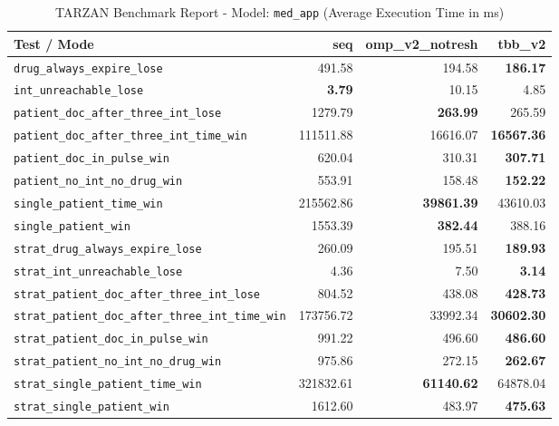 \begin{table}[htbp]
\centering
\caption{TARZAN Benchmark Report - Model: \texttt{med\_app} (Average Execution Time in ms)}
\label{tab:med_app_benchmark}
\begin{tabular}{lrrr}
\toprule
\textbf{Test / Mode} & \textbf{seq} & \textbf{omp\_v2\_notresh} & \textbf{tbb\_v2} \\
\midrule
\texttt{drug\_always\_expire\_lose} & 491.58 & 194.58 & \textbf{186.17} \\
\texttt{int\_unreachable\_lose} & \textbf{3.79} & 10.15 & 4.85 \\
\texttt{patient\_doc\_after\_three\_int\_lose} & 1279.79 & \textbf{263.99} & 265.59 \\
\texttt{patient\_doc\_after\_three\_int\_time\_win} & 111511.88 & 16616.07 & \textbf{16567.36} \\
\texttt{patient\_doc\_in\_pulse\_win} & 620.04 & 310.31 & \textbf{307.71} \\
\texttt{patient\_no\_int\_no\_drug\_win} & 553.91 & 158.48 & \textbf{152.22} \\
\texttt{single\_patient\_time\_win} & 215562.86 & \textbf{39861.39} & 43610.03 \\
\texttt{single\_patient\_win} & 1553.39 & \textbf{382.44} & 388.16 \\
\texttt{strat\_drug\_always\_expire\_lose} & 260.09 & 195.51 & \textbf{189.93} \\
\texttt{strat\_int\_unreachable\_lose} & 4.36 & 7.50 & \textbf{3.14} \\
\texttt{strat\_patient\_doc\_after\_three\_int\_lose} & 804.52 & 438.08 & \textbf{428.73} \\
\texttt{strat\_patient\_doc\_after\_three\_int\_time\_win} & 173756.72 & 33992.34 & \textbf{30602.30} \\
\texttt{strat\_patient\_doc\_in\_pulse\_win} & 991.22 & 496.60 & \textbf{486.60} \\
\texttt{strat\_patient\_no\_int\_no\_drug\_win} & 975.86 & 272.15 & \textbf{262.67} \\
\texttt{strat\_single\_patient\_time\_win} & 321832.61 & \textbf{61140.62} & 64878.04 \\
\texttt{strat\_single\_patient\_win} & 1612.60 & 483.97 & \textbf{475.63} \\
\bottomrule
\end{tabular}
\end{table}